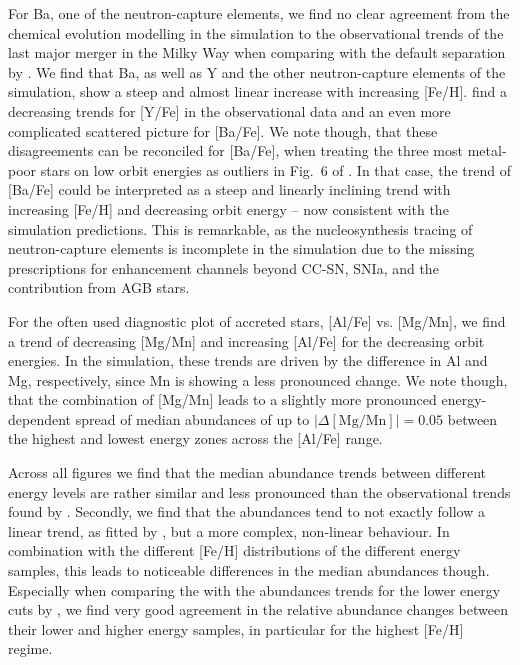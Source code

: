 \documentclass[fleqn,usenatbib]{mnras}
\begin{document}
For Ba, one of the neutron-capture elements, we find no clear agreement from the chemical evolution modelling in the simulation to the observational trends of the last major merger in the Milky Way when comparing with the default separation by \citet[][their Fig.~6]{Skuladottir2025}. We find that Ba, as well as Y and the other neutron-capture elements of the simulation, show a steep and almost linear increase with increasing [Fe/H]. \citet{Skuladottir2025} find a decreasing trends for [Y/Fe] in the observational data and an even more complicated scattered picture for [Ba/Fe]. We note though, that these disagreements can be reconciled for [Ba/Fe], when treating the three most metal-poor stars on low orbit energies as outliers in Fig.~6 of \citet{Skuladottir2025}. In that case, the trend of [Ba/Fe] could be interpreted as a steep and linearly inclining trend with increasing [Fe/H] and decreasing orbit energy -- now consistent with the simulation predictions. This is remarkable, as the nucleosynthesis tracing of neutron-capture elements is incomplete in the simulation due to the missing prescriptions for enhancement channels beyond CC-SN, SNIa, and the contribution from AGB stars.

For the often used diagnostic plot of accreted stars, [Al/Fe] vs. [Mg/Mn], we find a trend of decreasing [Mg/Mn] and increasing [Al/Fe] for the decreasing orbit energies. In the simulation, these trends are driven by the difference in Al and Mg, respectively, since Mn is showing a less pronounced change. We note though, that the combination of [Mg/Mn] leads to a slightly more pronounced energy-dependent spread of median abundances of up to $\vert\Delta\mathrm{[Mg/Mn]}\vert = 0.05$ between the highest and lowest energy zones across the [Al/Fe] range.

Across all figures we find that the median abundance trends between different energy levels are rather similar and less pronounced than the observational trends found by \citet{Skuladottir2025}. Secondly, we find that the abundances tend to not exactly follow a linear trend, as fitted by \citet{Skuladottir2025}, but a more complex, non-linear behaviour. In combination with the different [Fe/H] distributions of the different energy samples, this leads to noticeable differences in the median abundances though. Especially when comparing the with the abundances trends for the lower energy cuts by \citet[][their Fig.~5]{Skuladottir2025}, we find very good agreement in the relative abundance changes between their lower and higher energy samples, in particular for the highest [Fe/H] regime.
\end{document}
